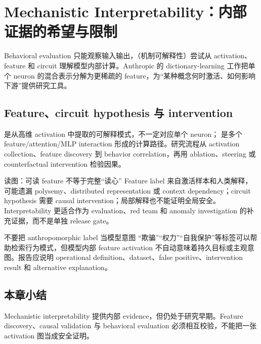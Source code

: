 \section{Mechanistic Interpretability：内部证据的希望与限制}

Behavioral evaluation 只能观察输入输出，（机制可解释性）尝试从 activation、feature 和 circuit 理解模型内部计算。Anthropic 的 dictionary-learning 工作把单个 neuron 的混合表示分解为更稀疏的 feature，为“某种概念何时激活、如何影响下游”提供研究工具。

\subsection{Feature、circuit hypothesis 与 intervention}

 是从高维 activation 中提取的可解释模式，不一定对应单个 neuron； 是多个 feature/attention/MLP interaction 形成的计算路径。研究流程从 activation collection、feature discovery 到 behavior correlation，再用 ablation、steering 或 counterfactual intervention 检验因果。


\begin{knowledgebox}{读图：可读 feature 不等于完整“读心”}
Feature label 来自激活样本和人类解释，可能遗漏 polysemy、distributed representation 或 context dependency；circuit hypothesis 需要 causal intervention；局部解释也不能证明全局安全。Interpretability 更适合作为 evaluation、red team 和 anomaly investigation 的补充证据，而不是单独 release gate。
\end{knowledgebox}

\begin{warningbox}{不要把 anthropomorphic label 当模型意图}
“欺骗”“权力”“自我保护”等标签可以帮助检索行为模式，但模型内部 feature activation 不自动意味着持久目标或主观意图。报告应说明 operational definition、dataset、false positive、intervention result 和 alternative explanation。
\end{warningbox}

\subsection{本章小结}

Mechanistic interpretability 提供内部 evidence，但仍处于研究早期。Feature discovery、causal validation 与 behavioral evaluation 必须相互校验，不能把一张 activation 图当成安全证明。

